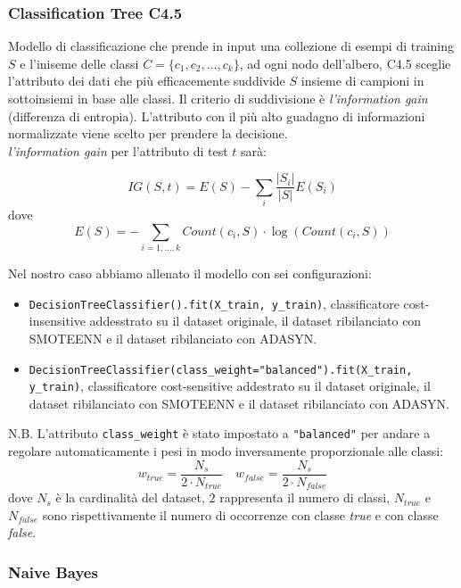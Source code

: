 \documentclass[italian,12pt,a4paper]{article}
\begin{document}
	\subsubsection{Classification Tree C4.5}
	Modello di classificazione che prende in input una collezione di esempi di training $S$ e l'iniseme delle classi $C = \{c_1, c_2, \dots, c_k\}$, ad ogni nodo dell'albero, C4.5 sceglie l'attributo dei dati che più efficacemente suddivide $S$ insieme di campioni in sottoinsiemi in base alle classi. Il criterio di suddivisione è \textit{l'information gain} (differenza di entropia). L'attributo con il più alto guadagno di informazioni normalizzate viene scelto per prendere la decisione. \\
	\textit{l'information gain} per l'attributo di test $t$ sarà:
	
	$$IG(S, t) = E(S) - \sum_i \frac{|S_i|}{|S|}E(S_i)$$ dove $$E(S) = -\sum_{i = 1, \dots, k} Count(c_i, S)\cdot\log(Count(c_i, S))$$
	
	Nel nostro caso abbiamo allenato il modello con sei configurazioni:
	
	\begin{itemize}
		\item \texttt{DecisionTreeClassifier().fit(X\_train, y\_train)}, classificatore cost-insensitive addesstrato su il dataset originale, il dataset ribilanciato con SMOTEENN e il dataset ribilanciato con ADASYN.
		\item \texttt{DecisionTreeClassifier(class\_weight="balanced").fit(X\_train, y\_train)}, classificatore cost-sensitive addestrato su il dataset originale, il dataset ribilanciato con SMOTEENN e il dataset ribilanciato con ADASYN.
		
	\end{itemize}
	
	N.B. L'attributo \texttt{class\_weight} è stato impostato a \texttt{"balanced"} per andare a regolare automaticamente i pesi in modo inversamente proporzionale alle classi: $$w_{true} = \frac{N_s}{2\cdot N_{true}} \quad w_{false} = \frac{N_s}{2\cdot N_{false}} $$ dove $N_s$ è la cardinalità del dataset, $2$ rappresenta il numero di classi, $N_{true}$ e $N_{false}$ sono rispettivamente il numero di occorrenze con classe \textit{true} e con classe \textit{false}.
	
	\subsubsection{Naive Bayes}
	
\end{document}

